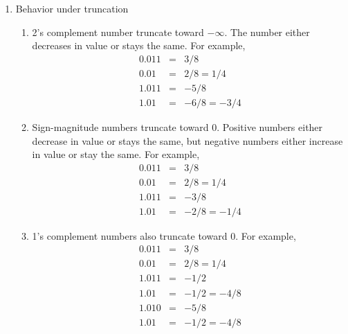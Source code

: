 \documentclass[times, twocolumn, 10pt]{article}
\begin{document}
\begin{enumerate}
\item Behavior under truncation
  \begin{enumerate}
  \item 2's complement number truncate toward $ -\infty $. The number either
    decreases in value or stays the same. For example,  
    \begin{eqnarray*}
      0.011 & = & 3/8 \\ 
      0.01  & = & 2/8 = 1/4 \\ 
      1.011 & = & -5/8 \\ 
      1.01  & = & -6/8 = -3/4
    \end{eqnarray*}
  \item Sign-magnitude numbers truncate toward 0. Positive numbers either
    decrease in value or stays the same, but negative numbers either
    increase in value or stay the same. For example,  
    \begin{eqnarray*}
      0.011 & = & 3/8 \\ 
      0.01  & = & 2/8 = 1/4 \\ 
      1.011 & = & -3/8 \\ 
      1.01  & = & -2/8 = -1/4
    \end{eqnarray*}
  \item 1's complement numbers also truncate toward 0. For example,  
    \begin{eqnarray*}
      0.011 & = & 3/8 \\ 
      0.01  & = & 2/8 = 1/4 \\ 
      1.011 & = & -1/2 \\ 
      1.01  & = & -1/2 = -4/8 \\ 
      1.010 & = & -5/8 \\ 
      1.01  & = & -1/2 = -4/8 \\ \\
    \end{eqnarray*}    
  \end{enumerate}
\end{enumerate}
\end{document}
